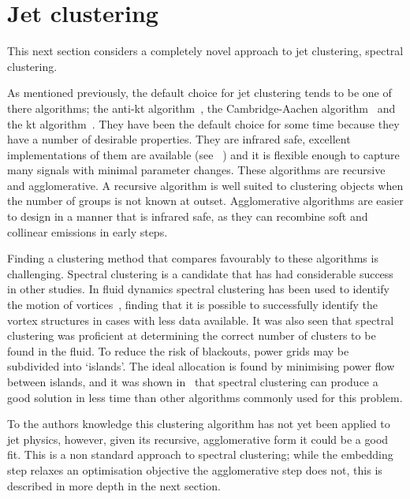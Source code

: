 \section{Jet clustering}\label{sec:JetClustering}
This next section considers a completely novel approach to jet clustering, spectral clustering.

As mentioned previously, the default choice for jet clustering tends to be one of there algorithms;
the anti-kt algorithm~\cite{Cacciari2008akt}, the Cambridge-Aachen algorithm~\cite{Wobisch1998caJet} and the kt algorithm~\cite{Ellis1993ktJet}.
They have been the default choice for some time because they have a number of desirable properties.
They are infrared safe, excellent implementations of them are available (see \fastjet{}~\cite{Cacciari2011FastJet})
and it is flexible enough to capture many signals with minimal parameter changes.
These algorithms are recursive and agglomerative.
A recursive algorithm is well suited to clustering objects when the number of groups is not known at outset.
Agglomerative algorithms are easier to design in a manner that is infrared safe,
as they can recombine soft and collinear emissions in early steps.

Finding a clustering method that compares favourably to these algorithms is challenging.
Spectral clustering is a candidate that has had considerable success in other studies.
In fluid dynamics spectral clustering has been used to identify the motion
of vortices~\cite{hadjighasem2016votex}, finding that it is possible
to successfully identify the vortex structures in cases with less data available.
It was also seen that spectral clustering was proficient at determining the correct number
of clusters to be found in the fluid.
To reduce the risk of blackouts, power grids may be subdivided into `islands'.
The ideal allocation is found by minimising power flow between islands,
and it was shown in~\cite{fennelly2014power} that spectral clustering
can produce a good solution in less time than other algorithms commonly used for this problem.


To the authors knowledge this clustering algorithm has not yet been applied to jet physics, %
however, given its recursive, agglomerative form it could be a good fit.
This is a non standard approach to spectral clustering; while the embedding step relaxes an optimisation objective
the agglomerative step does not, this is described in more depth in the next section.
